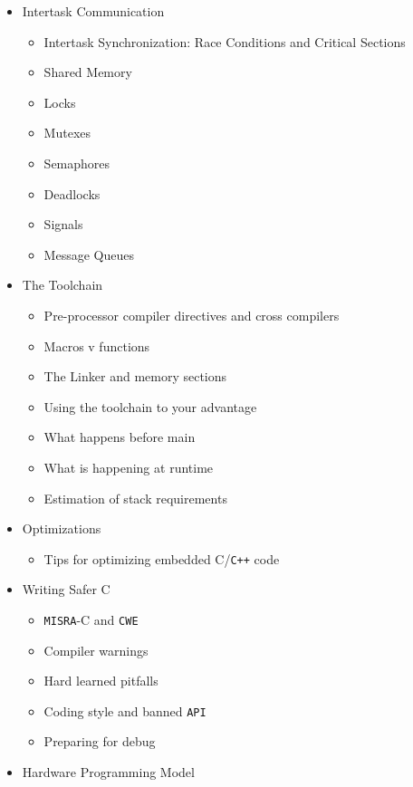 \documentclass[
]{article}
\providecommand{\tightlist}{%
  \setlength{\itemsep}{0pt}\setlength{\parskip}{0pt}}
\begin{document}
\begin{itemize}
  \begin{itemize}
  \tightlist
  \item
    Caching
  \item
    Hardware memory management
  \item
    Sections of a program
  \item
    Mapping of program in memory
  \item
    Dynamic memory allocation
  \end{itemize}
\item
  Intertask Communication

  \begin{itemize}
  \tightlist
  \item
    Intertask Synchronization: Race Conditions and Critical Sections
  \item
    Shared Memory
  \item
    Locks
  \item
    Mutexes
  \item
    Semaphores
  \item
    Deadlocks
  \item
    Signals
  \item
    Message Queues
  \end{itemize}
\item
  The Toolchain

  \begin{itemize}
  \tightlist
  \item
    Pre-processor compiler directives and cross compilers
  \item
    Macros v functions
  \item
    The Linker and memory sections
  \item
    Using the toolchain to your advantage
  \item
    What happens before main
  \item
    What is happening at runtime
  \item
    Estimation of stack requirements
  \end{itemize}
\item
  Optimizations

  \begin{itemize}
  \tightlist
  \item
    Tips for optimizing embedded C/\texttt{C++} code
  \end{itemize}
\item
  Writing Safer C

  \begin{itemize}
  \tightlist
  \item
    \texttt{MISRA}-C and \texttt{CWE}
  \item
    Compiler warnings
  \item
    Hard learned pitfalls
  \item
    Coding style and banned \texttt{API}
  \item
    Preparing for debug
  \end{itemize}
\item
  Hardware Programming Model


\end{itemize}
\end{document}

